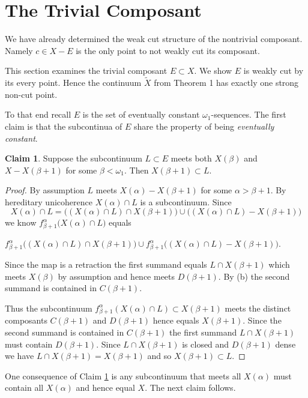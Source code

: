 \documentclass[12pt]{article}
\theoremstyle{plain}
\theoremstyle{definition}
\newcounter{ClaimCounter}
\newtheorem{claim}[ClaimCounter]{Claim}
\newcounter{claim5counter}
\newcommand{\A}{\ensuremath{\alpha}}
\newcommand{\B}{\ensuremath{\beta}}
\newcommand{\W}{\ensuremath{\omega}}
\newcommand{\0}{\ensuremath{\varnothing}}
\begin{document}
	\section{The Trivial Composant}
	\noindent
	We have already determined the weak cut structure of the nontrivial composant.
	Namely $c \in X-E$ is the only point to not weakly cut its composant.
	
	This section examines the trivial composant $E \subset X$.
	We show $E$ is weakly cut by its every point.
	Hence the continuum $\widetilde X$ from Theorem 1 has exactly one strong non-cut point.
	
	To that end recall $E$ is the set of eventually constant $\W_1$-sequences. The first claim is that the subcontinua of $E$ share the property of being \textit{eventually constant}.
	
	\begin{claim}\label{stab}
		Suppose the subcontinuum $L \subset E$ meets both $X(\B)$ and $X - X(\B+1)$ for some $\B<\W_1$.
		Then $X(\B+1) \subset L$.
	\end{claim}
	
	\begin{proof}
		By assumption $L$ meets $X(\A) - X(\B+1)$ for some $\A > \B+1$.
		By hereditary unicoherence $X(\A) \cap L$ is a subcontinuum. 
		Since $$X(\A) \cap L =   \big ((X(\A) \cap L) \cap X(\B+1) \big) \cup \big ((X(\A) \cap L) - X(\B+1) \big )$$ we know $f^{\A}_{\B+1} \big (X(\A) \cap L \big) $ equals
		\begin{center}
			$ 
			f^{\A}_{\B+1}\big ( (X(\A) \cap L) \cap X(\B+1) \big) \cup f^{\A}_{\B+1} \big ((X(\A) \cap L) - X(\B+1) \big )$.
		\end{center}
		
		Since the map is a retraction the first summand equals $L \cap X(\B+1)$ which meets $X(\B)$ by assumption and hence meets $D(\B+1)$.
		By (b) the second summand is contained in $C(\B+1)$.
		
		Thus the subcontinuum $f^{\A}_{\B+1}  (X(\A) \cap L ) \subset X(\B+1)$ meets the distinct composants $C(\B+1)$ and $D(\B+1)$ 
		hence equals $X(\B+1)$.
		Since the second summand is contained in $C(\B+1)$ the first summand $L \cap X(\B+1)$ must contain $D(\B+1)$.
		Since $L \cap X(\B+1)$ is closed and $D(\B+1)$ dense we have $L \cap X(\B+1) = X(\B+1)$ and so $X(\B+1) \subset L$.
	\end{proof}
	
	One consequence of Claim \ref{stab} is any subcontinuum that meets all $X(\A)$ must contain all $X(\A)$ and hence equal $X$.
	The next claim follows.
	
\end{document}
